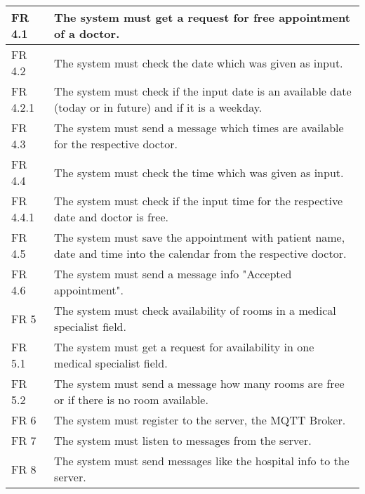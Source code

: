 \begin{table}
\begin{tabular}{|l|l|}
\hline
\rowcolor[rgb]{0.894,0.894,0.894} 
FR 4.1  & The system must get a request for free appointment of a doctor.                    
\\ 
\hline
FR 4.2  & The system must check the date which was given as input.                           
\\ 
\hline
\rowcolor[rgb]{0.894,0.894,0.894} 
FR 4.2.1 & The system must check if the input date is an available date (today or in future) and if it is a weekday.    
\\ 
\hline
FR 4.3 & The system must send a message which times are available for the respective doctor.                           
\\ 
\hline
\rowcolor[rgb]{0.894,0.894,0.894} 
FR 4.4 & The system must check the time which was given as input.                           
\\ 
\hline
FR 4.4.1 & The system must check if the input time for the respective date and doctor is free.                           
\\ 
\hline
\rowcolor[rgb]{0.894,0.894,0.894} 
FR 4.5 & The system must save the appointment with patient name, date and time into the calendar from the respective doctor.  
\\ 
\hline
FR 4.6 & The system must send a message info "Accepted appointment".                                                   
\\ 
\hline
\rowcolor[rgb]{0.894,0.894,0.894} 
FR 5  & The system must check availability of rooms in a medical specialist field.                                  
\\ 
\hline
FR 5.1  & The system must get a request for availability in one medical specialist field.                             
\\ 
\hline
\rowcolor[rgb]{0.894,0.894,0.894} 
FR 5.2  & The system must send a message how many rooms are free or if there is no room available.                      
\\
\hline
FR 6  & The system must register to the server, the MQTT Broker.                      
\\
\hline
\rowcolor[rgb]{0.894,0.894,0.894} 
FR 7  & The system must listen to messages from the server.                      
\\
\hline
FR 8  & The system must send messages like the hospital info to the server.                      
\\
\hline
\hline
 


\end{tabular}
\end{table}
